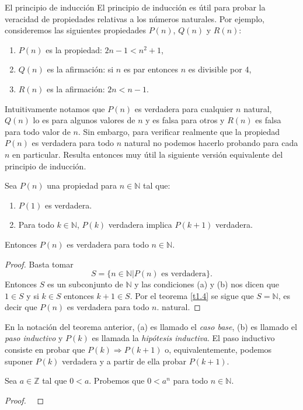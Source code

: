 \begin{section}{El principio de inducción}
El principio de inducción es útil para probar la veracidad de propiedades relativas a los
números naturales. Por ejemplo, consideremos las siguientes propiedades $P(n)$, $Q(n)$ y $R(n)$:
\begin{enumerate}[label=(\alph*)]
\item $P(n)$ es la propiedad: $2n -1 < n^2 + 1$,
\item $Q(n)$ es la afirmación: si $n$ es par entonces $n$ es divisible por 4,
\item $R(n)$ es la afirmación: $2n < n- 1$.
\end{enumerate}
Intuitivamente notamos que $P(n)$ es verdadera para cualquier $n$ natural, $Q(n)$ lo es para algunos
valores de $n$ y es falsa para otros y $R(n)$ es falsa para todo valor de $n$. Sin
embargo, para verificar realmente que la propiedad $P(n)$ es verdadera para todo $n$ natural no
podemos hacerlo probando para cada $n$ en particular. Resulta entonces muy útil la siguiente
versión equivalente del principio de inducción.
\begin{teorema}\label{induccion2} Sea $P(n)$ una propiedad para $n \in \mathbb N$ tal que:
\begin{enumerate}[label=(\alph*)]
\item $P(1)$ es verdadera.
\item Para todo $k \in \mathbb N$, $P(k)$ verdadera implica $P(k + 1)$ verdadera.
\end{enumerate}
Entonces $P(n)$ es verdadera para todo $n \in \mathbb N$.
\end{teorema}
\begin{proof} Basta tomar
$$S = \{n \in \mathbb N| P(n) \text{ es verdadera} \}.$$
Entonces $S$ es un subconjunto de $\mathbb N$ y las condiciones (a) y (b) nos dicen que $1 \in S$ y  si $ k \in S$ entonces $k+1\in S$. Por el teorema \ref{t1.4} se sigue que $S= \mathbb N$, es decir que $P(n)$ es verdadera para todo $n$.
natural.
\end{proof}


En la notación del teorema anterior, (a) es llamado  el {\em caso base}, (b) es llamado el  {\em paso inductivo} y $P(k)$ es llamada la {\em hipótesis inductiva}. El paso inductivo  consiste en probar que $P(k) \Rightarrow P(k + 1)$ o, equivalentemente, podemos suponer $P(k)$ verdadera y a partir de ella probar $P(k + 1)$. 


\begin{ejemplo}\label{ejemplo141} Sea $a\in \mathbb Z$ tal que $0<a$. Probemos que $0<a^n$ para todo $n \in \mathbb N$.
\end{ejemplo}
\begin{proof}
\


\end{proof}
\end{section}
